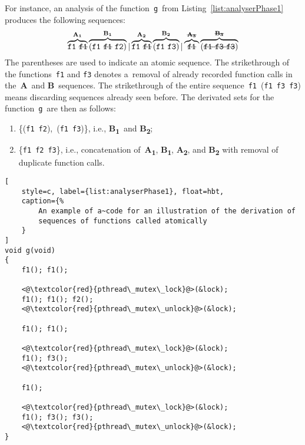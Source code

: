 \begin{example}
    For instance, an analysis of the function~\texttt{g}~from
    Listing~\ref{list:analyserPhase1} produces the following sequences:
    $$
        \overbrace{%
            \text{\texttt{f1}~\sout{\texttt{f1}}}
        }^\text{\textbf{A\textsubscript{1}}}
        \overbrace{%
            (\text{\texttt{f1}~\sout{\texttt{f1}}~\texttt{f2}})
        }^\text{\textbf{B\textsubscript{1}}} |
        \overbrace{%
            \text{\texttt{f1}~\sout{\texttt{f1}}}
        }^\text{\textbf{A\textsubscript{2}}}
        \overbrace{%
            (\text{\texttt{f1}~\texttt{f3}})
        }^\text{\textbf{B\textsubscript{2}}} |
        \overbrace{%
            \text{\sout{\texttt{f1}}}
        }^\text{\sout{\textbf{A\textsubscript{3}}}}
        \overbrace{%
            (\text{\sout{\texttt{f1}~\texttt{f3}~\texttt{f3}}})
        }^\text{\sout{\textbf{B\textsubscript{3}}}}
    $$
    The parentheses are used to indicate an atomic sequence. The 
    strikethrough of the functions~\texttt{f1} and \texttt{f3} denotes 
    a~removal of already recorded function calls in 
    the~\textbf{A}~and \textbf{B}~sequences. The strikethrough of the 
    entire sequence~\texttt{f1}~(\texttt{f1}~\texttt{f3}~\texttt{f3})
    means discarding sequences already seen before. The derivated sets for 
    the function~\texttt{g}~are then as follows:
    \begin{enumerate}[label={(\roman*)}]
        \item
           \{(\texttt{f1}~\texttt{f2}),~(\texttt{f1}~\texttt{f3})\}, i.e.,
           \textbf{B\textsubscript{1}}~and \textbf{B\textsubscript{2}};
    
        \item
            \{\texttt{f1}~\texttt{f2}~\texttt{f3}\}, i.e.,
            concatenation of~\textbf{A\textsubscript{1}},
            \textbf{B\textsubscript{1}}, \textbf{A\textsubscript{2}},
            and \textbf{B\textsubscript{2}} with removal of duplicate
            function calls.
    
    \end{enumerate}
\end{example}

\begin{lstlisting}[
    style=c, label={list:analyserPhase1}, float=hbt,
    caption={%
        An example of a~code for an illustration of the derivation of
        sequences of functions called atomically
    }
]
void g(void)
{
    f1(); f1();

    <@\textcolor{red}{pthread\_mutex\_lock}@>(&lock);
    f1(); f1(); f2();
    <@\textcolor{red}{pthread\_mutex\_unlock}@>(&lock);

    f1(); f1();

    <@\textcolor{red}{pthread\_mutex\_lock}@>(&lock);
    f1(); f3();
    <@\textcolor{red}{pthread\_mutex\_unlock}@>(&lock);

    f1();

    <@\textcolor{red}{pthread\_mutex\_lock}@>(&lock);
    f1(); f3(); f3();
    <@\textcolor{red}{pthread\_mutex\_unlock}@>(&lock);
}
\end{lstlisting}

